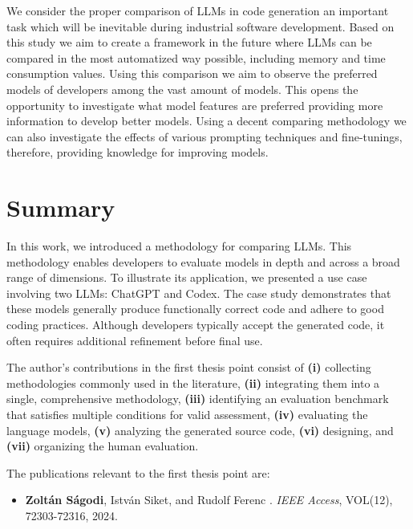 We consider the proper comparison of LLMs in code generation an important task which will be inevitable during industrial software development.
Based on this study we aim to create a framework in the future where LLMs can be compared in the most automatized way possible, including memory and time consumption values.
Using this comparison we aim to observe the preferred models of developers among the vast amount of models.
This opens the opportunity to investigate what model features are preferred providing more information to develop better models.
Using a decent comparing methodology we can also investigate the effects of various prompting techniques and fine-tunings, therefore, providing knowledge for improving models.

\section{Summary}

In this work, we introduced a methodology for comparing LLMs.
This methodology enables developers to evaluate models in depth and across a broad range of dimensions.
To illustrate its application, we presented a use case involving two LLMs: ChatGPT and Codex.
The case study demonstrates that these models generally produce functionally correct code and adhere to good coding practices.
Although developers typically accept the generated code, it often requires additional refinement before final use.

\vspace*{1cm}
The author’s contributions in the first thesis point consist of \textbf{(i)} collecting methodologies commonly used in the literature, \textbf{(ii)} integrating them into a single, comprehensive methodology, \textbf{(iii)} identifying an evaluation benchmark that satisfies multiple conditions for valid assessment, \textbf{(iv)} evaluating the language models, \textbf{(v)} analyzing the generated source code, \textbf{(vi)} designing, and \textbf{(vii)} organizing the human evaluation.

The publications relevant to the first thesis point are:
\begin{itemize}
	\item \textbf{Zoltán Ságodi}, István Siket, and Rudolf Ferenc
	.
	\newblock \emph{IEEE Access}, VOL(12), 72303-72316, 2024.
\end{itemize}
